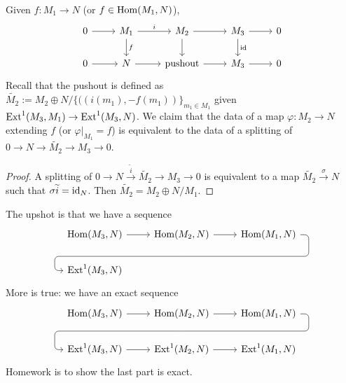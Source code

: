 Given $f \colon  M_1 \to N$ (or $f \in \operatorname{Hom}(M_1,N)$), \[
\begin{tikzcd}
0 \arrow[r] & M_1 \arrow[d, "f"] \arrow[r, "i"] & M_2 \arrow[r] \arrow[d]  & M_3 \arrow[d, "\id"] \arrow[r] & 0 \\
0 \arrow[r] & N \arrow[r]                       & \text{pushout} \arrow[r] & M_3 \arrow[r]                  & 0
\end{tikzcd}
\] Recall that the pushout is defined as $\widetilde {M_2}:= M_2 \oplus N / \{ ((i(m_1),-f(m_1))\} _{m_1 \in M_1}$ given $\operatorname{Ext}^1(M_3,M_1) \to \operatorname{Ext}^1(M_3,N)$. We claim that the data of a map $\varphi  \colon M_2 \to N$ extending $f$ (or $\left. \varphi  \right| _{M_1}=f$) is equivalent to the data of a splitting of $0 \to N \to  \widetilde {M_2} \to M_3 \to 0$.
    \begin{proof}
        A splitting of $0 \to  N \xrightarrow{\widetilde  i} \widetilde {M_2} \to  M_3 \to 0$ is equivalent to a map $\widetilde {M_2} \xrightarrow{\sigma} N$ such that $\sigma \widetilde i =\operatorname{id} _N$. Then $\widetilde {M_2} =M_2\oplus N / M_1$.
    \end{proof}The upshot is that we have a sequence \[
\begin{tikzcd}
    \Hom(M_3,N) \rar & \Hom(M_2,N) \rar
             \ar[draw=none]{d}[name=X, anchor=center]{}
                     & \Hom(M_1,N) \ar[rounded corners,
            to path={ -- ([xshift=2ex]\tikztostart.east)
                      |- (X.center) \tikztonodes
                      -| ([xshift=-2ex]\tikztotarget.west)
                      -- (\tikztotarget)}]{dll}[at end]{} \\      
    \Ext^1(M_3,N) & {}  & {} 
\end{tikzcd}
    \] More is true: we have an exact sequence \[
\begin{tikzcd}
    \Hom(M_3,N) \rar & \Hom(M_2,N) \rar
             \ar[draw=none]{d}[name=X, anchor=center]{}
                     & \Hom(M_1,N) \ar[rounded corners,
            to path={ -- ([xshift=2ex]\tikztostart.east)
                      |- (X.center) \tikztonodes
                      -| ([xshift=-2ex]\tikztotarget.west)
                      -- (\tikztotarget)}]{dll}[at end]{} \\      
    \Ext^1(M_3,N) \rar & \Ext^1(M_2,N) \rar & \Ext^1(M_1,N)
\end{tikzcd}
    \] Homework is to show the last part is exact.
